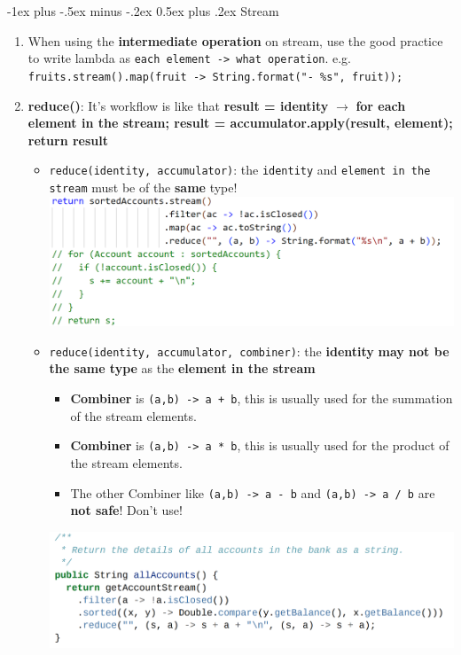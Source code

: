 \documentclass[10pt, landscape]{article}
\makeatletter
\renewcommand{\section}{\@startsection{section}{1}{0mm}%
                                {-1ex plus -.5ex minus -.2ex}%
                                {0.5ex plus .2ex}%
                                {\normalfont\large\bfseries}}
\makeatother
\begin{document}
\begin{multicols}{4}
\section{Stream}
\begin{enumerate}
    \item When using the \textbf{intermediate operation} on stream, use the good practice to write lambda as \texttt{each element -> what operation}. e.g. \texttt{fruits.stream().map(fruit -> String.format("- \%s", fruit));}
    \item \textbf{reduce()}: It's workflow is like that \textbf{result = identity} $\rightarrow$ \textbf{for each element in the stream; result = accumulator.apply(result, element); return result}
    \begin{itemize}
        \item \texttt{reduce(identity, accumulator)}: the \texttt{identity} and \texttt{element in the stream} must be of the \textbf{same} type! \\
        \includegraphics[width=1\linewidth]{PE/PE2/images/1.png}
        \item \texttt{reduce(identity, accumulator, combiner)}: the \textbf{identity} \textbf{may not be the same type} as the \textbf{element in the stream} 
        \begin{itemize}
            \item \textbf{Combiner} is \texttt{(a,b) -> a + b}, this is usually used for the summation of the stream elements.
            \item \textbf{Combiner} is \texttt{(a,b) -> a * b}, this is usually used for the product of the stream elements.
            \item The other Combiner like \texttt{(a,b) -> a - b} and \texttt{(a,b) -> a / b} are \textbf{not safe}! Don't use!
        \end{itemize}
        \includegraphics[width=1\linewidth]{PE/PE2/images/2.png}

\end{itemize}
\end{enumerate}
\end{multicols}
\end{document}
